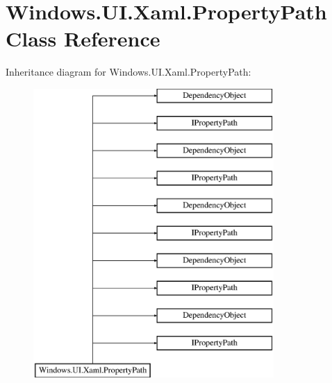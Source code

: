 \hypertarget{class_windows_1_1_u_i_1_1_xaml_1_1_property_path}{}\section{Windows.\+U\+I.\+Xaml.\+Property\+Path Class Reference}
\label{class_windows_1_1_u_i_1_1_xaml_1_1_property_path}
Inheritance diagram for Windows.\+U\+I.\+Xaml.\+Property\+Path\+:\begin{figure}[H]
\begin{center}
\leavevmode
\includegraphics[height=11.000000cm]{class_windows_1_1_u_i_1_1_xaml_1_1_property_path}
\end{center}
\end{figure}
